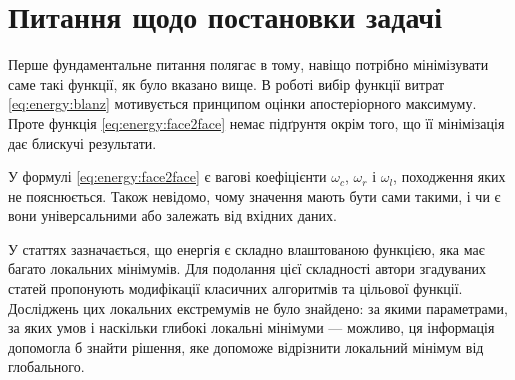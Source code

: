 \section{Питання щодо постановки задачі}

Перше фундаментальне питання полягає в тому,
навіщо потрібно мінімізувати саме такі функції, як було вказано вище.
В роботі \cite{blanz:romdhani:vetter} вибір функції витрат
\eqref{eq:energy:blanz} мотивується принципом оцінки апостеріорного максимуму.
Проте функція \eqref{eq:energy:face2face} немає підґрунтя окрім того,
що її мінімізація дає блискучі результати.

У формулі \eqref{eq:energy:face2face} є
вагові коефіцієнти $\omega_c$, $\omega_r$ і $\omega_l$,
походження яких не пояснюється.
Також невідомо, чому значення мають бути сами такими,
і чи є вони універсальними або залежать від вхідних даних.

У статтях зазначається,
що енергія є складно влаштованою функцією,
яка має багато локальних мінімумів.
Для подолання цієї складності
автори згадуваних статей пропонують
модифікації класичних алгоритмів
та цільової функції.
Досліджень цих локальних екстремумів не було знайдено:
за якими параметрами, за яких умов і наскільки глибокі локальні мінімуми ---
можливо, ця інформація допомогла б знайти рішення,
яке допоможе відрізнити локальний мінімум від глобального.
